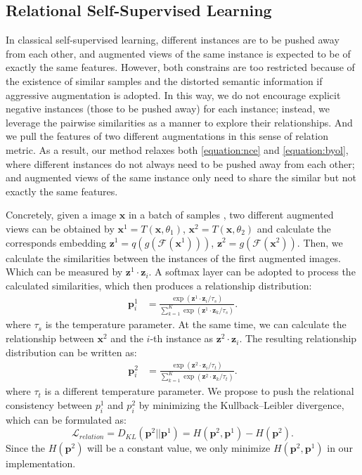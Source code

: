 \documentclass{article}
\newcommand{\<}{\left\langle}
\renewcommand{\>}{\right\rangle}
\begin{document}
\subsection{Relational Self-Supervised Learning}
In classical self-supervised learning, different instances are to be pushed away from each other, and augmented views of the same instance is expected to be of exactly the same features. However, both constrains are too restricted because of the existence of similar samples and the distorted semantic information if aggressive augmentation is adopted. In this way, we do not encourage explicit negative instances (those to be pushed away) for each instance; instead, we leverage the pairwise similarities as a manner to explore their relationships. And we pull the features of two different augmentations in this sense of relation metric. As a result, our method relaxes both \eqref{equation:nce} and \eqref{equation:byol}, where different instances do not always need to be pushed away from each other; and augmented views of the same instance only need to share the similar but not exactly the same features. 

Concretely, given a image $\mathbf{x}$ in a batch of samples , two different augmented views can be obtained by $\mathbf{x}^1 = T(\mathbf{x}, \theta_1)$, $\mathbf{x}^2 = T(\mathbf{x}, \theta_2)$ and calculate the corresponds embedding  $\mathbf{z}^1 = q(g(\mathcal{F} (\mathbf{x}^1)))$, $\mathbf{z}^2 = g(\mathcal{F}(\mathbf{x}^2))$. Then, we calculate the similarities between the instances of the first augmented images. Which can be measured by $\mathbf{z}^{1} \cdot \mathbf{z}_{i}$. A softmax layer can be adopted to process the calculated similarities, which then produces a relationship distribution:
\begin{align}
    \mathbf{p}^1_i &= \frac{\exp(\mathbf{z}^{1} \cdot \mathbf{z}_{i}/ \tau_s) }{\sum_{k=1}^{K}  \exp(\mathbf{z}^{1} \cdot \mathbf{z}_{k} / \tau_s) }. \label{equation:teacher}
\end{align}
where $\tau_s$ is the temperature parameter. At the same time, we can calculate the relationship between $\mathbf{x}^2$ and the $i$-th instance as $\mathbf{z}^{2} \cdot \mathbf{z}_{i}$. The resulting relationship distribution can be written as:
\begin{align}
    \mathbf{p}^2_i &= \frac{\exp(\mathbf{z}^{2} \cdot \mathbf{z}_{i} / \tau_t) }{\sum_{k=1}^{K}  \exp(\mathbf{z}^{2} \cdot \mathbf{z}_{k} / \tau_t) }. \label{equation:student}
\end{align}
where $\tau_t$ is a different temperature parameter. We propose to push the relational consistency between $p^{1}_i$ and $p^{2}_i$ by minimizing the Kullback–Leibler divergence, which can be formulated as:
\begin{equation}
    \label{equation:loss}
    \mathcal{L}_{relation} =  D_{KL} (\mathbf{p}^2 || \mathbf{p}^1) = H(\mathbf{p}^2, \mathbf{p}^1) - H(\mathbf{p}^2).
\end{equation}
Since the $H(\mathbf{p}^2)$ will be a constant value, we only minimize $H(\mathbf{p}^2,\mathbf{p}^1)$ in our implementation.
\end{document}
